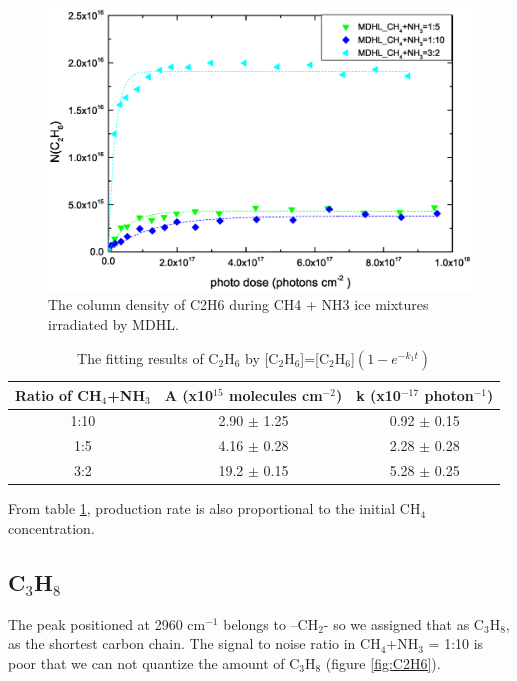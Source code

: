\begin{figure}
\centering
\includegraphics[width=\textwidth]{figures/chapter3/Lab_C2H6.eps}
\caption{The column density of C2H6 during CH4 + NH3 ice mixtures irradiated by MDHL. }
\label{fig:lab_C2H6}
\end{figure}

\begin{table}[htbp]
\caption{The fitting results of C$_2$H$_6$ by [C$_2$H$_6$]=[C$_2$H$_6$]$(1 - e^{-k_1 t})$}
\label{tab:fittingC2H6}
\begin{tabular}{ccc}
\hline
\hline
Ratio of CH$_4$+NH$_3$ & A (x10$^{15}$ molecules cm$^{-2}$) & k (x10$^{-17}$ photon$^{-1}$) \\
\hline
1:10 & 2.90 $\pm$ 1.25 & 0.92 $\pm$ 0.15 \\
1:5 & 4.16 $\pm$ 0.28 & 2.28 $\pm$ 0.28 \\
3:2 & 19.2 $\pm$ 0.15 & 5.28 $\pm$ 0.25 \\
\hline
\end{tabular}
\end{table}

From table \ref{tab:fittingC2H6}, production rate is also proportional to the initial CH$_4$ concentration.


\subsection{C$_3$H$_8$}

The peak positioned at 2960 cm$^{-1}$ belongs to –CH$_2$- so we assigned that as C$_3$H$_8$, as the shortest carbon chain. The signal to noise ratio in CH$_4$+NH$_3$ = 1:10 is poor that we can not quantize the amount of C$_3$H$_8$ (figure \ref{fig:C2H6}).

